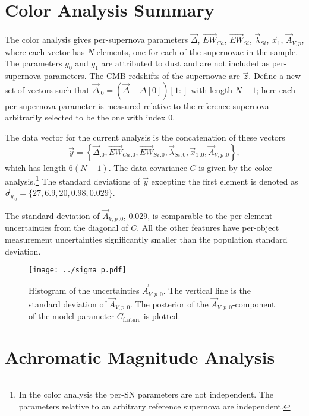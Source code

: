 \documentclass{aastex61}   	%
\begin{document}
\section{Color Analysis Summary}
\label{color:sec}
The color analysis gives per-supernova parameters
$\vec{\Delta}$,  $\overrightarrow{EW}_{Ca}$,  $\overrightarrow{EW}_{Si}$,  $\vec{\lambda}_{Si}$,   $\vec{x}_1$,  $\vec{A}_{V,p}$,
where each vector has $N$ elements, one for each of the supernovae in the sample.  The parameters $g_0$ and $g_1$ are attributed to dust
and are not included as per-supernova parameters.  The CMB redshifts of the supernovae are $\vec{z}$.  Define a new set of vectors such that
$\vec{\Delta}_{.0} = (\vec{\Delta} - \Delta[0])[1:]$ with length $N-1$; here each per-supernova parameter is measured relative to the
reference supernova arbitrarily selected to be the one with index 0.

The data vector for the current analysis is the concatenation of these vectors
\[
\vec{y} = \left\{\vec{\Delta}_{.0} , \overrightarrow{EW}_{Ca\,.0} ,  \overrightarrow{EW}_{Si\,.0},  \vec{\lambda}_{Si\,.0},   \vec{x}_{1\,.0}, \vec{A}_{V,p\,.0}\right\},
\]
which has length $6(N-1)$.  The data covariance $C$ is given by the color analysis.\footnote{In
the color analysis the per-SN parameters
are not independent.  The parameters relative to an arbitrary reference supernova are independent.}
The standard deviations of $\vec{y}$ excepting the first element is denoted as $\vec{\sigma}_{y_{.0}}=\{27,  6.9,  20,   0.98,   0.029\}$.

The  standard deviation of $\vec{A}_{V,p\,.0}$, 0.029,  is comparable to the per element uncertainties from the diagonal of $C$.
All the other features have per-object measurement uncertainties significantly smaller than the population standard deviation.

\begin{figure}[htbp] %
   \centering
   \texttt{[image: ../sigma\_p.pdf]}
   \caption{
Histogram of the uncertainties $\vec{A}_{V,p\,.0}$.  The vertical line is the standard deviation of $\vec{A}_{V,p\,.0}$.
The posterior of the $\vec{A}_{V,p\,.0}$-component of the model parameter $C_{\text{feature}}$ is plotted.
   \label{sigma_p:fig}}
\end{figure}


\section{Achromatic Magnitude Analysis}
\end{document}
